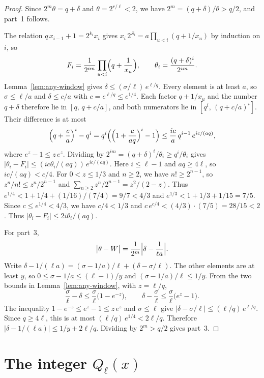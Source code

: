 \documentclass[11pt]{article}
\begin{document}
\begin{proof}
Since $2^m \theta = q + \delta$ and $\theta = 2^{r/\ell} < 2$, we have $2^m = (q+\delta)/\theta > q/2$, and part~1 follows.

The relation $q\, x_{i-1} + 1 = 2^{k_i} x_i$ gives $x_i\, 2^{S_i} = a \prod_{u < i}(q + 1/x_u)$ by induction on $i$, so
\[
F_i = \frac{1}{2^{im}}\prod_{u < i}\Bigl(q + \frac{1}{x_u}\Bigr), \qquad \theta_i = \frac{(q+\delta)^i}{2^{im}}.
\]
Lemma~\ref{lem:any-window} gives $\delta \le (\sigma/\ell)\, e^{\ell/q}$.
Every element is at least $a$, so $\sigma \le \ell/a$ and $\delta \le c/a$ with $c = e^{\ell/q} \le e^{1/4}$.
Each factor $q + 1/x_u$ and the number $q+\delta$ therefore lie in $[q,\, q + c/a]$, and both numerators lie in $[q^i,\, (q + c/a)^i]$.
Their difference is at most
\[
\Bigl(q + \frac{c}{a}\Bigr)^i - q^i = q^i\Bigl(\Bigl(1 + \frac{c}{aq}\Bigr)^i - 1\Bigr) \le \frac{ic}{a}\, q^{i-1}\, e^{ic/(aq)},
\]
where $e^z - 1 \le z\, e^z$.
Dividing by $2^{im} = (q+\delta)^i/\theta_i \ge q^i/\theta_i$ gives $\lvert \theta_i - F_i \rvert \le (ic\theta_i/(aq))\, e^{ic/(aq)}$.
Here $i \le \ell - 1$ and $aq \ge 4\ell$, so $ic/(aq) < c/4$.
For $0 < z \le 1/3$ and $n \ge 2$, we have $n! \ge 2^{n-1}$, so $z^n/n! \le z^n/2^{n-1}$ and $\sum_{n \ge 2} z^n/2^{n-1} = z^2/(2-z)$.
Thus $e^{1/4} < 1 + 1/4 + (1/16)/(7/4) = 9/7 < 4/3$ and $e^{1/3} < 1 + 1/3 + 1/15 = 7/5$.
Since $c \le e^{1/4} < 4/3$, we have $c/4 < 1/3$ and $c\, e^{c/4} < (4/3) \cdot (7/5) = 28/15 < 2$.
Thus $\lvert \theta_i - F_i \rvert \le 2i\theta_i/(aq)$.

For part~3,
\[
\bigl\lvert \theta - W \bigr\rvert = \frac{1}{2^m}\Bigl\lvert \delta - \frac{1}{\ell a} \Bigr\rvert.
\]
Write $\delta - 1/(\ell a) = (\sigma - 1/a)/\ell + (\delta - \sigma/\ell)$.
The other elements are at least $y$, so $0 \le \sigma - 1/a \le (\ell-1)/y$ and $(\sigma - 1/a)/\ell \le 1/y$.
From the two bounds in Lemma~\ref{lem:any-window}, with $z = \ell/q$,
\[
\frac{\sigma}{\ell} - \delta \le \frac{\sigma}{\ell}\bigl(1 - e^{-z}\bigr), \qquad \delta - \frac{\sigma}{\ell} \le \frac{\sigma}{\ell}\bigl(e^z - 1\bigr).
\]
The inequality $1 - e^{-z} \le e^z - 1 \le z\, e^z$ and $\sigma \le \ell$ give $\lvert \delta - \sigma/\ell \rvert \le (\ell/q)\, e^{\ell/q}$.
Since $q \ge 4\ell$, this is at most $(\ell/q)\, e^{1/4} < 2\ell/q$.
Therefore $\lvert \delta - 1/(\ell a) \rvert \le 1/y + 2\ell/q$.
Dividing by $2^m > q/2$ gives part~3.
\end{proof}

\section{The integer $Q_\ell(x)$}
\label{sec:ql}
\end{document}
